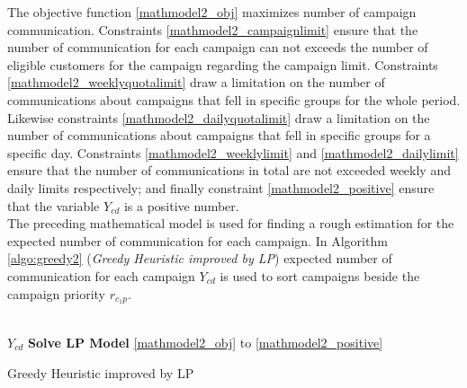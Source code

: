 \documentclass[11pt]{article}
\begin{document}
The objective function \eqref{mathmodel2_obj} maximizes number of campaign communication. Constraints \eqref{mathmodel2_campaignlimit} ensure that the number of communication for each campaign can not exceeds the number of eligible customers for the campaign regarding the campaign limit. Constraints \eqref{mathmodel2_weeklyquotalimit} draw a limitation on the number of communications about campaigns that fell in specific groups for the whole period. Likewise constraints \eqref{mathmodel2_dailyquotalimit} draw a limitation on the number of communications about campaigns that fell in specific groups for a specific day. Constraints \eqref{mathmodel2_weeklylimit} and \eqref{mathmodel2_dailylimit} ensure that the number of communications in total are not exceeded weekly and daily limits respectively; and finally constraint \eqref{mathmodel2_positive} ensure that the variable $Y_{{c}{d}}$ is a positive number.\\

The preceding mathematical model is used for finding a rough estimation for the expected number of communication for each campaign. In Algorithm \ref{algo:greedy2} (\textit{Greedy Heuristic improved by LP}) expected number of communication for each campaign $Y_{{c}{d}}$ is used to sort campaigns beside the campaign priority $r_{c_{1}p}$.

\begin{algorithm}[H]
\\
$Y_{{c}{d}}$ \gets \textbf{Solve LP Model} \eqref{mathmodel2_obj} to \eqref{mathmodel2_positive}
\\
\caption{Greedy Heuristic improved by LP}
\label{algo:greedy2}
\end{algorithm}\\
\end{document}

